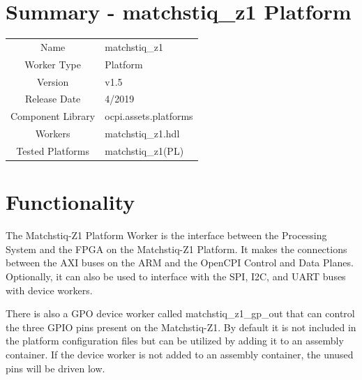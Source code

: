 \documentclass{article}
\author{} %
\date{Version \docVersion} %
\title{\docTitle}
\def\docVersion{1.5}
\def\comp{matchstiq\_z1}
\def\Comp{matchstiq\_z1 Platform}
\begin{document}
\section*{Summary - \Comp}
\begin{tabular}{|c|M{13.5cm}|}
	\hline
	                  &                                                    \\
	\hline
	Name              & \comp                                              \\
	\hline
	Worker Type       & Platform                                           \\
	\hline
	Version           & v\docVersion \\
	\hline
	Release Date      & 4/2019 \\
	\hline
	Component Library & ocpi.assets.platforms \\
	\hline
	Workers & \comp.hdl \\
	\hline
	Tested Platforms  & matchstiq\_z1(PL) \\
	\hline
\end{tabular}

\section*{Functionality}
\begin{flushleft}
The Matchstiq-Z1 Platform Worker is the interface between the Processing System and the FPGA on the Matchstiq-Z1 Platform. It makes the connections between the AXI buses on the ARM and the OpenCPI Control and Data Planes. Optionally, it can also be used to interface with the SPI, I2C, and UART buses with device workers. \newline

There is also a GPO device worker called matchstiq\_z1\_gp\_out that can control the three GPIO pins present on the Matchstiq-Z1. By default it is not included in the platform configuration files but can be utilized by adding it to an assembly container. If the device worker is not added to an assembly container, the unused pins will be driven low.

\end{flushleft}
\end{document}
